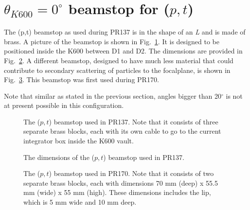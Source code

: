 \documentclass[11pt]{report}
\begin{document}
\section{$\theta_{K600}=0^{\circ}$ beamstop for ($p,t$)}

The (p,t) beamstop  as used during PR137 is in the shape of an {\it L} and is made of brass. 
A picture of the beamstop is shown in Fig.~\ref{fig:internal-beamstop-1}.
It is designed to be positioned inside the K600 between D1 and D2.
The dimensions are provided in Fig.~\ref{fig:internal-beamstop-fig}.
A different beamstop, designed to have much less material that could contribute to 
secondary scattering of particles to the focalplane, is shown in Fig.~\ref{fig:internal-beamstop-2}.
This beamstop was first used during PR170.

Note that similar as stated in the previous section, angles bigger than 20$^{\circ}$ is not
at present possible in this configuration.





\begin{figure}[!ht]
\centerline{\vspace{0cm}\hspace{0cm}
}
\centering
\caption{The ($p,t$) beamstop used in PR137. 
Note that it consists of three separate brass blocks, each with
its own cable to go to the current integrator box inside the K600 vault.}
\label{fig:internal-beamstop-1}
\end{figure} 

\begin{figure}[!ht]
\centerline{\vspace{0cm}\hspace{0cm}
}
\centering
\caption{The dimensions of the ($p,t$) beamstop used in PR137.}
\label{fig:internal-beamstop-fig}
\end{figure} 

\begin{figure}[!ht]
\centerline{\vspace{0cm}\hspace{0cm}
}
\centering
\caption{The ($p,t$) beamstop used in PR170. 
Note that it consists of two separate brass blocks, each with dimensions 70 mm (deep) x 55.5 mm (wide) x 55 mm (high).
These dimensions includes the lip, which is 5 mm wide and 10 mm deep.}
\label{fig:internal-beamstop-2}
\end{figure} 
\end{document}
